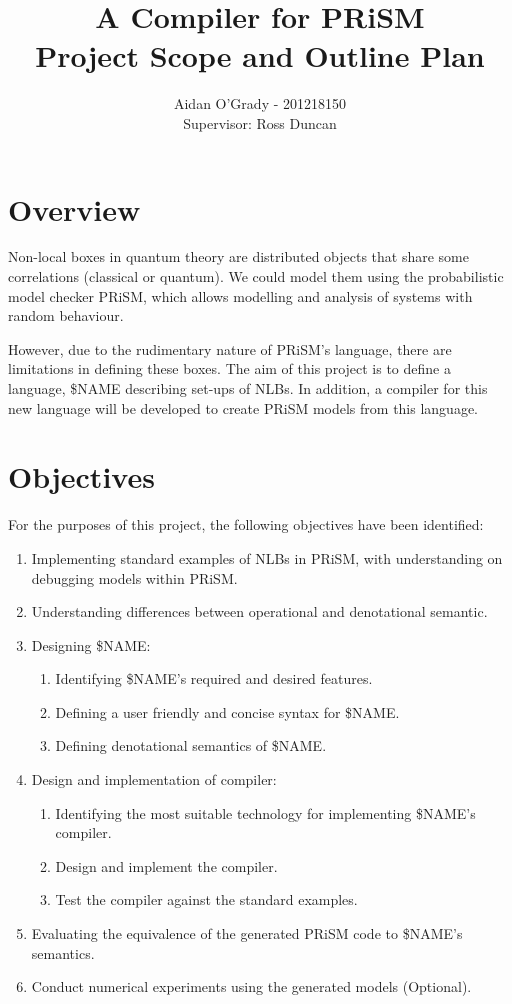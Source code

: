 \documentclass[11pt, a4paper]{article}
\begin{document}
\title{A Compiler for PRiSM \\
\large{Project Scope and Outline Plan}}
\author{Aidan O'Grady - 201218150\\Supervisor: Ross Duncan}
\date{}
\maketitle
\newpage

\section{Overview} %
\label{sec:overview}
Non-local boxes in quantum theory are distributed objects that share some
correlations (classical or quantum). We could model them using the probabilistic
model checker PRiSM, which allows modelling and analysis of systems with random
behaviour.

However, due to the rudimentary nature of PRiSM's language, there are
limitations in defining these boxes. The aim of this project is to define a
language, \$NAME describing set-ups of NLBs. In addition, a compiler for this new language will be developed to create PRiSM models from this language.


\section{Objectives} %
\label{sec:objectives}
For the purposes of this project, the following objectives have been identified:
\begin{enumerate}
    \item Implementing standard examples of NLBs in PRiSM, with understanding on
    debugging models within PRiSM.
    \item Understanding differences between operational and denotational
    semantic.
    \item Designing \$NAME:
    \begin{enumerate}
        \item Identifying \$NAME's required and desired features.
        \item Defining a user friendly and concise syntax for \$NAME.
        \item Defining denotational semantics of \$NAME.
    \end{enumerate}
    \item Design and implementation of compiler:
    \begin{enumerate}
        \item Identifying the most suitable technology for implementing \$NAME's
        compiler.
        \item Design and implement the compiler.
        \item Test the compiler against the standard examples.
    \end{enumerate}
    \item Evaluating the equivalence of the generated PRiSM code to \$NAME's
    semantics.
    \item Conduct numerical experiments using the generated models (Optional).
\end{enumerate}
\end{document}
